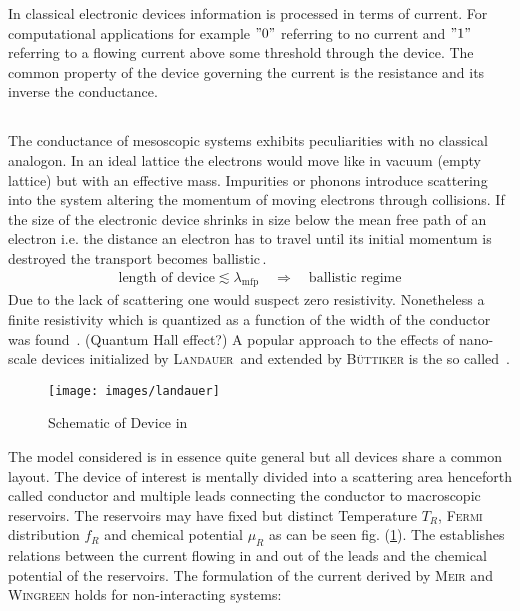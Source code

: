 In classical electronic devices information is processed in terms of current. For computational applications for example $"0"$ referring to no current and $"1"$ referring to a flowing current above some threshold through the device. The common property of the device governing the current is the resistance and its inverse the conductance.
\subsection{\clanbform{}}\label{sec:landauerbuettiker}
The conductance of mesoscopic systems exhibits peculiarities with no classical analogon.  
In an ideal lattice the electrons would move like in vacuum (empty lattice) but with an effective mass. Impurities or phonons introduce scattering into the system altering the momentum of moving electrons through collisions.
If the size of the electronic device shrinks in size below the mean free path of an electron i.e. the distance an electron has to travel until its initial momentum is destroyed the transport becomes ballistic\,\cite{datta1989quantum}. 
\begin{align}
	\text{length of device} \lesssim \lambda_{\text{mfp}}\quad \Rightarrow \quad\text{ballistic regime}
	\label{eqn:meanfreepath}
\end{align}
Due to the lack of scattering one would suspect zero resistivity. Nonetheless a finite resistivity which is quantized as a function of the width of the conductor was found \,\cite{PhysRevLett.60.848}.
(Quantum Hall effect?)
A popular approach to the effects of nano-scale devices initialized by \textsc{Landauer}\,\cite{PhilMag.21.863} and extended by \textsc{B\"uttiker} is the so called \lanbform{}\,\cite{PhysRevB.31.6207}.  
\begin{figure}[h]
\centering
\texttt{[image: images/landauer]} 
\caption{Schematic of Device in \lanbform{}}
\label{fig:lanbform}
\end{figure}
The model considered is in essence quite general but all devices share a common layout. The device of interest is mentally divided into a scattering area henceforth called conductor and multiple leads connecting the conductor to macroscopic reservoirs. The reservoirs may have fixed but distinct Temperature $T_R$, \textsc{Fermi} distribution $f_R$ and chemical potential $\mu_R$ as can be seen fig. (\ref{fig:lanbform}).
The \lanbform{} establishes relations between the current flowing in and out of the leads and the chemical potential of the reservoirs. The formulation of the current derived by \textsc{Meir} and \textsc{Wingreen}\cite{PhysRevLett.68.2512} holds for non-interacting systems:

